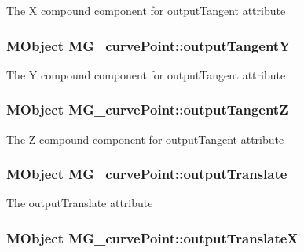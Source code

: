 The X compound component for output\-Tangent attribute \hypertarget{class_m_g__curve_point_ae54be9fde6c16833d50760fd4969a86d}{
\subsubsection[{output\-Tangent\-Y}]{\setlength{\rightskip}{0pt plus 5cm}M\-Object M\-G\-\_\-curve\-Point\-::output\-Tangent\-Y\hspace{0.3cm}{\ttfamily [static]}}}\label{class_m_g__curve_point_ae54be9fde6c16833d50760fd4969a86d}
The Y compound component for output\-Tangent attribute \hypertarget{class_m_g__curve_point_a898c4d8f7dec9296950b06562a8831b2}{
\subsubsection[{output\-Tangent\-Z}]{\setlength{\rightskip}{0pt plus 5cm}M\-Object M\-G\-\_\-curve\-Point\-::output\-Tangent\-Z\hspace{0.3cm}{\ttfamily [static]}}}\label{class_m_g__curve_point_a898c4d8f7dec9296950b06562a8831b2}
The Z compound component for output\-Tangent attribute \hypertarget{class_m_g__curve_point_a847125bfa0a6946db60dd2fffe6e5a37}{
\subsubsection[{output\-Translate}]{\setlength{\rightskip}{0pt plus 5cm}M\-Object M\-G\-\_\-curve\-Point\-::output\-Translate\hspace{0.3cm}{\ttfamily [static]}}}\label{class_m_g__curve_point_a847125bfa0a6946db60dd2fffe6e5a37}
The output\-Translate attribute \hypertarget{class_m_g__curve_point_a6f51d7ea668cb3c1200c2dab41858d10}{
\subsubsection[{output\-Translate\-X}]{\setlength{\rightskip}{0pt plus 5cm}M\-Object M\-G\-\_\-curve\-Point\-::output\-Translate\-X\hspace{0.3cm}{\ttfamily [static]}}}\label{class_m_g__curve_point_a6f51d7ea668cb3c1200c2dab41858d10}
